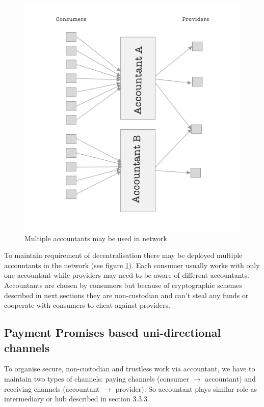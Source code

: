 \documentclass[a4paper,12pt]{article}
\begin{document}
\begin{figure}[H]
    \centering
    \includegraphics[scale=0.5]{../img/multi-accountants}
    \caption{Multiple accountants may be used in network}
    \label{img:multi-accountants}
\end{figure}

To maintain requirement of decentralisation there may be deployed multiple 
accountants in the network (see figure \ref{img:multi-accountants}). Each 
consumer usually works with only one accountant while providers may need to be 
aware of different accountants. Accountants are chosen by consumers but because 
of cryptographic schemes described in next sections they are non-custodian and 
can't steal any funds or cooperate with consumers to cheat against providers.

\subsection{Payment Promises based uni-directional channels}

To organise secure, non-custodian and trustless work via accountant, we have to 
maintain two types of channels: paying channels (consumer $\rightarrow$ 
accountant) and receiving channels (accountant $\rightarrow$ provider). So 
accountant plays similar role as intermediary or hub described in section 3.3.3.
\end{document}
